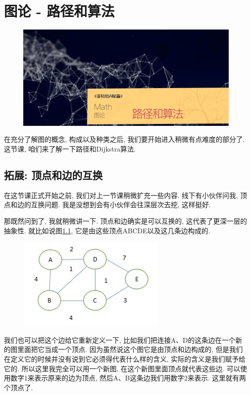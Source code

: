 \chapter{图论 - 路径和算法}

\begin{figure}[ht]
  \centering
  \includegraphics[width=1\linewidth]{asset/20230924051220.png}
\end{figure}

\newpage

在充分了解图的概念, 构成以及种类之后, 我们要开始进入稍微有点难度的部分了. 这节课, 咱们来了解一下路径和Dijkstra算法. 

\section{拓展: 顶点和边的互换}

在这节课正式开始之前, 我们对上一节课稍微扩充一些内容. 线下有小伙伴问我, 顶点和边的互换问题. 我是没想到会有小伙伴会往深层次去挖, 这样挺好. 

那既然问到了, 我就稍微讲一下. 顶点和边确实是可以互换的, 这代表了更深一层的抽象性. 就比如说图\ref{fig:img26_1}, 它是由这些顶点ABCDE以及这几条边构成的. 

\begin{figure}[ht]
  \centering
  \includegraphics[width=0.5\linewidth]{asset/20230924051221.jpg}
  \caption{}
  \label{fig:img26_1}
\end{figure}

我们也可以把这个边给它重新定义一下, 比如我们把连接A、D的这条边在一个新的图里面把它当成一个顶点. 因为虽然说这个图它是由顶点和边构成的, 但是我们在定义它的时候并没有说到它必须得代表什么样的含义, 实际的含义是我们赋予给它的. 所以这里我完全可以用一个新图, 在这个新图里面顶点就代表这些边. 
可以使用数字1来表示原来的边为顶点, 然后A、B这条边我们用数字2来表示. 这里就有两个顶点了. 

